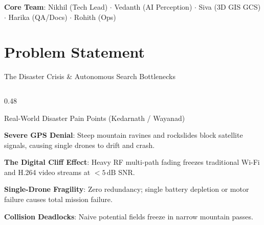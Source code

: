 \documentclass[aspectratio=169, 10pt]{beamer}
\begin{document}
\begin{frame}[plain]
  \vspace{0.3cm}
  \begin{center}
    {\tiny \color{TextMuted} \textbf{Core Team}: Nikhil (Tech Lead) $\cdot$ Vedanth (AI Perception) $\cdot$ Siva (3D GIS GCS) $\cdot$ Harika (QA/Docs) $\cdot$ Rohith (Ops)}
  \end{center}
\end{frame}

\section{Problem Statement}
\begin{frame}{The Disaster Crisis \& Autonomous Search Bottlenecks}
  \begin{columns}[T]
    \begin{column}{0.48\textwidth}
      \begin{warningcard}{Real-World Disaster Pain Points (Kedarnath / Wayanad)}
        \begin{itemize}\setlength{\itemsep}{3pt}
          {\tiny
            \item \textbf{Severe GPS Denial}: Steep mountain ravines and rockslides block satellite signals, causing single drones to drift and crash.
            \item \textbf{The Digital Cliff Effect}: Heavy RF multi-path fading freezes traditional Wi-Fi and H.264 video streams at $< 5\,\text{dB}$ SNR.
            \item \textbf{Single-Drone Fragility}: Zero redundancy; single battery depletion or motor failure causes total mission failure.
            \item \textbf{Collision Deadlocks}: Naive potential fields freeze in narrow mountain passes.
          }
        \end{itemize}
      \end{warningcard}
    \end{column}


\end{columns}
\end{frame}
\end{document}

